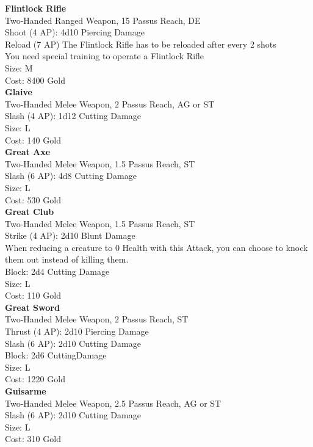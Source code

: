 \textbf{Flintlock Rifle}\\
Two-Handed Ranged Weapon, 15 Passus Reach, DE\\
Shoot (4 AP): 4d10 Piercing Damage\\
Reload (7 AP) The Flintlock Rifle has to be reloaded after every 2 shots\\
You need special training to operate a Flintlock Rifle\\
Size: M\\
Cost: 8400 Gold\\

\textbf{Glaive}\\
Two-Handed Melee Weapon, 2 Passus Reach, AG or ST\\
Slash (4 AP): 1d12 Cutting Damage\\
Size: L\\
Cost: 140 Gold\\


\textbf{Great Axe}\\
Two-Handed Melee Weapon, 1.5 Passus Reach, ST\\
Slash (6 AP): 4d8 Cutting Damage\\
Size: L\\
Cost: 530 Gold\\

\textbf{Great Club}\\
Two-Handed Melee Weapon, 1.5 Passus Reach, ST\\
Strike (4 AP): 2d10 Blunt Damage\\
When reducing a creature to 0 Health with this Attack, you can choose to knock them out instead of killing them.\\
Block: 2d4 Cutting Damage\\
Size: L\\
Cost: 110 Gold\\


\textbf{Great Sword}\\
Two-Handed Melee Weapon, 2 Passus Reach, ST\\
Thrust (4 AP): 2d10 Piercing Damage\\
Slash (6 AP): 2d10 Cutting Damage\\
Block: 2d6 CuttingDamage\\
Size: L\\
Cost: 1220 Gold\\


\textbf{Guisarme}\\
Two-Handed Melee Weapon, 2.5 Passus Reach, AG or ST\\
Slash (6 AP): 2d10 Cutting Damage\\
Size: L\\
Cost: 310 Gold\\


